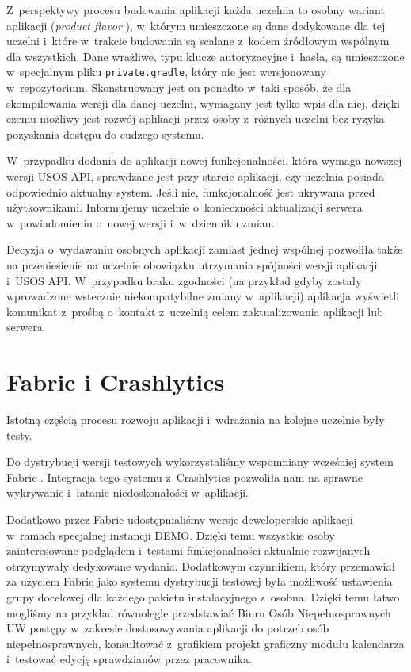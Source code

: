 \documentclass{pracamgr}
\begin{document}
Z~perspektywy procesu budowania aplikacji każda uczelnia to osobny wariant aplikacji 
(\textit{product flavor} \cite{product-flavor}), w~którym umieszczone są dane dedykowane dla tej uczelni i~które w~trakcie
budowania są scalane z~kodem źródłowym wspólnym dla wszystkich. Dane wrażliwe, typu klucze autoryzacyjne i~hasła, są
umieszczone w~specjalnym pliku \texttt{private.gradle}, który nie jest wersjonowany w~repozytorium. Skonstruowany jest on
ponadto w~taki sposób, że dla skompilowania wersji dla danej uczelni, wymagany jest tylko wpis dla niej, dzięki czemu
możliwy jest rozwój aplikacji przez osoby z~różnych uczelni bez ryzyka pozyskania dostępu do cudzego systemu.

W~przypadku dodania do aplikacji nowej funkcjonalności, która wymaga nowszej wersji USOS API, sprawdzane jest przy starcie
aplikacji, czy uczelnia posiada odpowiednio aktualny system. Jeśli nie, funkcjonalność jest ukrywana przed użytkownikami.
Informujemy uczelnie o~konieczności aktualizacji serwera w~powiadomieniu o~nowej wersji i~w~dzienniku zmian.

Decyzja o~wydawaniu osobnych aplikacji zamiast jednej wspólnej pozwoliła także na przeniesienie na uczelnie obowiązku
utrzymania spójności wersji aplikacji i~USOS API. W~przypadku braku zgodności (na przykład gdyby zostały wprowadzone
wstecznie niekompatybilne zmiany w~aplikacji) aplikacja wyświetli komunikat z~prośbą o~kontakt z~uczelnią celem zaktualizowania
aplikacji lub serwera.

\section{Fabric i Crashlytics}

Istotną częścią procesu rozwoju aplikacji i~wdrażania na kolejne uczelnie były testy.

Do dystrybucji wersji testowych wykorzystaliśmy wspomniany wcześniej system Fabric \cite{fabric}. 
Integracja tego systemu z~Crashlytics pozwoliła nam na sprawne wykrywanie i~łatanie niedoskonałości w~aplikacji.

Dodatkowo przez Fabric udostępnialiśmy wersje deweloperskie aplikacji w~ramach specjalnej instancji DEMO. Dzięki temu
wszystkie osoby zainteresowane podglądem i~testami funkcjonalności aktualnie rozwijanych otrzymywały dedykowane wydania.
Dodatkowym czynnikiem, który przemawiał za użyciem Fabric jako systemu dystrybucji testowej była możliwość ustawienia grupy
docelowej dla każdego pakietu instalacyjnego z~osobna. Dzięki temu łatwo mogliśmy na przykład równolegle przedstawiać
Biuru Osób Niepełnosprawnych UW postępy w~zakresie dostosowywania aplikacji do potrzeb osób niepełnosprawnych, konsultować
z~grafikiem projekt graficzny modułu kalendarza i~testować edycję sprawdzianów przez pracownika.
\end{document}

